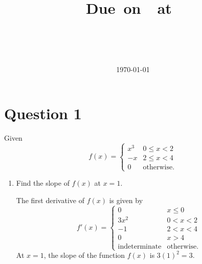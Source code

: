 \documentclass{article}
\title{
    \vspace{2in}
    \textmd{\textbf{\unitName}} \\
    \vspace{0.1in}
    \textbf{\docTitle} \\
    \vspace{0.1in}
    \small{Due\ on\ \dueDate\ at\ \dueTime} \\
    \vspace{0.1in}
    \large{\textit{\unitInstructorName}} \\
    \vspace{0.1in}
    \unitTime
    \vspace{2in}
}
\author{\textbf{\authorName} \\ \authorStudentNumber}
\date{\today}
\begin{document}
\maketitle
\newpage
\section{Question 1}
Given
\begin{equation}
    f\left( x \right) =
    \begin{cases}
        x^3 & 0 \leqslant x < 2 \\
        -x  & 2 \leqslant x < 4 \\
        0   & \text{otherwise}.
    \end{cases}
\end{equation}
\begin{enumerate}[label=(\alph*)]
    \item Find the slope of \(f\left( x \right)\) at \(x = 1\).
          \begin{solution}
              The first derivative of \(f\left( x \right)\) is given by
              \begin{equation*}
                  f'\left( x \right) =
                  \begin{cases}
                      0                    & x \leqslant 0     \\
                      3x^2                 & 0 < x < 2         \\
                      -1                   & 2 < x < 4         \\
                      0                    & x > 4             \\
                      \text{indeterminate} & \text{otherwise}.
                  \end{cases}
              \end{equation*}
              At \(x = 1\), the slope of the function \(f\left( x \right)\) is
              \(3 \left( 1 \right)^2 = 3\).
          \end{solution}
\end{enumerate}
\newpage
\printbibliography
\end{document}
